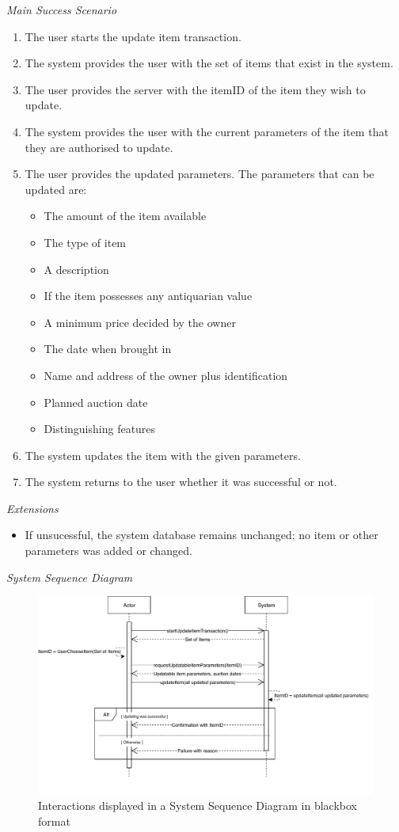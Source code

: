 \textsl{Main Success Scenario}
\begin{enumerate}[noitemsep]
	\item The user starts the update item transaction.
	\item The system provides the user with the set of items that exist in the system.
	\item The user provides the server with the itemID of the item they wish to update. 
	\item The system provides the user with the current parameters of the item that they are authorised to update.
	\item The user provides the updated parameters. The parameters that can be updated are:
	\begin{itemize}[noitemsep]
		\item The amount of the item available
		\item The type of item
		\item A description
		\item If the item possesses any antiquarian value
		\item A minimum price decided by the owner
		\item The date when brought in
		\item Name and address of the owner plus identification
		\item Planned auction date
		\item Distinguishing features
	\end{itemize}
	\item The system updates the item with the given parameters.
	\item The system returns to the user whether it was successful or not. 
\end{enumerate}
\textsl{Extensions}
\begin{itemize}[noitemsep]
	\item If unsucessful, the system database remains unchanged; no item or other parameters was added or changed.
\end{itemize}
\textsl{System Sequence Diagram}
\begin{figure}[H]
	\centering
	\includegraphics[scale=1]{uml/SD-bb-update.pdf}
	\caption*{Interactions displayed in a System Sequence Diagram in blackbox format}
\end{figure}